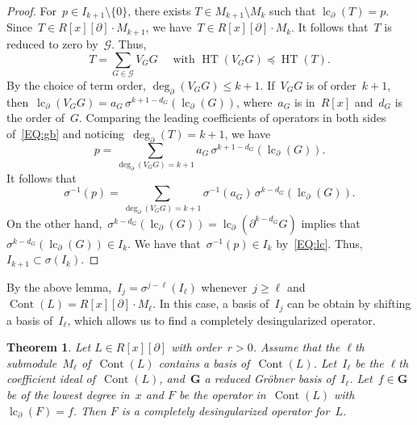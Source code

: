 \documentclass{sig-alternate}
\newcommand{\cont}{\operatorname{Cont}}
\newcommand{\lc}{\operatorname{lc}}
\newcommand{\si} { {\sigma}}
\newcommand{\pa}{\partial}
\newtheorem{theorem}{Theorem}[section]
\begin{document}
\begin{proof}
For~$p {\in} I_{k + 1} {\setminus} \{0\}$, there exists $T \in M_{k + 1} \setminus  M_k$ such that $\lc_{\pa}(T) {=} p$.
Since~$T {\in} R[x][\pa] \cdot M_{k + 1}$, we have~$T {\in} R[x][\pa] \cdot M_k$.  It follows that~$T$ is reduced to zero by~$\mathcal{G}$. Thus,
\begin{equation} \label{EQ:gb}
T = \sum_{G \in \mathcal{G}} V_G G \quad \text{ with~$\operatorname{HT}(V_G G) \preceq \operatorname{HT}(T)$}.
\end{equation}
By the choice of term order, $\deg_{\pa}(V_G G) \leq k + 1$. If~$V_G G$ is of order~$k+1$, then~$\lc_\pa(V_G G) = a_G  \, \si^{k  + 1 - d_G}(\lc_{\pa}(G))$,
where~$a_G$ is in~$R[x]$ and~$d_G$ is the order of~$G$. Comparing the leading coefficients of operators in both sides of~\eqref{EQ:gb} and noticing~$\deg_\pa(T)=k+1$, we have
\[ p = \sum_{\deg_{\pa}(V_G G) = k + 1} a_G \, \si^{k  + 1 - d_G}(\lc_{\pa}(G)). \]
It follows that
\begin{equation} \label{EQ:lc}
\si^{-1} \left(p\right) = \sum_{\deg_{\pa}(V_G G) = k + 1} \sigma^{-1}(a_G) \, \si^{k  - d_G}(\lc_{\pa}(G)).
\end{equation}
On the other hand,~$\si^{k - d_G}(\lc_{\pa}(G)) = \lc_\pa\left(\pa^{k-d_G} G\right)$ implies that~$\si^{k - d_G}(\lc_{\pa}(G)) \in I_k$.
We have that~$\si^{-1}(p) \in I_k$ by~\eqref{EQ:lc}. Thus,~$I_{k+1}  \subset \si(I_k)$.
\end{proof}
By the above lemma,~$I_j = \si^{j-\ell}(I_\ell)$ whenever~$j \ge \ell$ and~$\cont(L)=R[x][\pa]\cdot M_\ell$. In this case,
a basis of~$I_j$ can be obtain by shifting a basis of~$I_\ell$, which allows us to find a completely desingularized
operator.
\begin{theorem} \label{TH:gbcd}
Let $L \in R[x][\pa]$ with order~$r>0$.
Assume that the $\ell$th submodule~$M_\ell$ of~$\cont(L)$ contains a basis of~$\cont(L)$. Let~$I_\ell$ be the $\ell$th coefficient
ideal of~$\cont(L)$, and~$\mathbf{G}$ a reduced Gr\"obner basis of~$I_\ell$.
Let~$f \in \mathbf{G}$ be of the lowest degree in~$x$ and $F$ be the operator in~$\cont(L)$ with~$\lc_\pa(F)=f$.
Then $F$ is a completely desingularized operator for~$L$.
\end{theorem}
\end{document}
